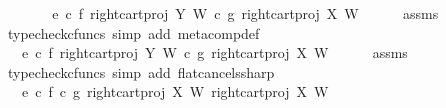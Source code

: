 \begin{isabellebody}
\ \ \isamarkupfalse%
\ \isamarkupfalse%
\ {\isachardoublequoteopen}{\isachardot}{\kern0pt}{\isachardot}{\kern0pt}{\isachardot}{\kern0pt}\ {\isacharequal}{\kern0pt}\ {\isacharparenleft}{\kern0pt}{\isacharparenleft}{\kern0pt}e\isactrlsup {\isasymflat}\ {\isasymcirc}\isactrlsub c\ {\isasymlangle}f\isactrlsup {\isasymflat}{\isacharcomma}{\kern0pt}\ right{\isacharunderscore}{\kern0pt}cart{\isacharunderscore}{\kern0pt}proj\ Y\ W{\isasymrangle}{\isacharparenright}{\kern0pt}\isactrlsup {\isasymsharp}\isactrlsup {\isasymflat}\ {\isasymcirc}\isactrlsub c\ {\isasymlangle}g\isactrlsup {\isasymflat}{\isacharcomma}{\kern0pt}\ right{\isacharunderscore}{\kern0pt}cart{\isacharunderscore}{\kern0pt}proj\ X\ W{\isasymrangle}{\isacharparenright}{\kern0pt}\isactrlsup {\isasymsharp}{\isachardoublequoteclose}\isanewline
\ \ \ \ \isamarkupfalse%
\ assms\ \isamarkupfalse%
\ {\isacharparenleft}{\kern0pt}typecheck{\isacharunderscore}{\kern0pt}cfuncs{\isacharcomma}{\kern0pt}\ simp\ add{\isacharcolon}{\kern0pt}\ meta{\isacharunderscore}{\kern0pt}comp{}{\isacharunderscore}{\kern0pt}def{}{\isacharparenright}{\kern0pt}\isanewline
\ \ \isamarkupfalse%
\ \isamarkupfalse%
\ {\isachardoublequoteopen}{\isachardot}{\kern0pt}{\isachardot}{\kern0pt}{\isachardot}{\kern0pt}\ {\isacharequal}{\kern0pt}\ {\isacharparenleft}{\kern0pt}{\isacharparenleft}{\kern0pt}e\isactrlsup {\isasymflat}\ {\isasymcirc}\isactrlsub c\ {\isasymlangle}f\isactrlsup {\isasymflat}{\isacharcomma}{\kern0pt}\ right{\isacharunderscore}{\kern0pt}cart{\isacharunderscore}{\kern0pt}proj\ Y\ W{\isasymrangle}{\isacharparenright}{\kern0pt}\ {\isasymcirc}\isactrlsub c\ {\isasymlangle}g\isactrlsup {\isasymflat}{\isacharcomma}{\kern0pt}\ right{\isacharunderscore}{\kern0pt}cart{\isacharunderscore}{\kern0pt}proj\ X\ W{\isasymrangle}{\isacharparenright}{\kern0pt}\isactrlsup {\isasymsharp}{\isachardoublequoteclose}\isanewline
\ \ \ \ \isamarkupfalse%
\ assms\ \isamarkupfalse%
\ {\isacharparenleft}{\kern0pt}typecheck{\isacharunderscore}{\kern0pt}cfuncs{\isacharcomma}{\kern0pt}\ simp\ add{\isacharcolon}{\kern0pt}\ flat{\isacharunderscore}{\kern0pt}cancels{\isacharunderscore}{\kern0pt}sharp{\isacharparenright}{\kern0pt}\ \ \ \ \isanewline
\ \ \isamarkupfalse%
\ \isamarkupfalse%
\ {\isachardoublequoteopen}{\isachardot}{\kern0pt}{\isachardot}{\kern0pt}{\isachardot}{\kern0pt}\ {\isacharequal}{\kern0pt}\ {\isacharparenleft}{\kern0pt}e\isactrlsup {\isasymflat}\ {\isasymcirc}\isactrlsub c\ {\isasymlangle}f\isactrlsup {\isasymflat}\ {\isasymcirc}\isactrlsub c\ {\isasymlangle}g\isactrlsup {\isasymflat}{\isacharcomma}{\kern0pt}\ right{\isacharunderscore}{\kern0pt}cart{\isacharunderscore}{\kern0pt}proj\ X\ W{\isasymrangle}\ {\isacharcomma}{\kern0pt}right{\isacharunderscore}{\kern0pt}cart{\isacharunderscore}{\kern0pt}proj\ X\ W{\isasymrangle}{\isacharparenright}{\kern0pt}\isactrlsup {\isasymsharp}{\isachardoublequoteclose}\isanewline

\end{isabellebody}
